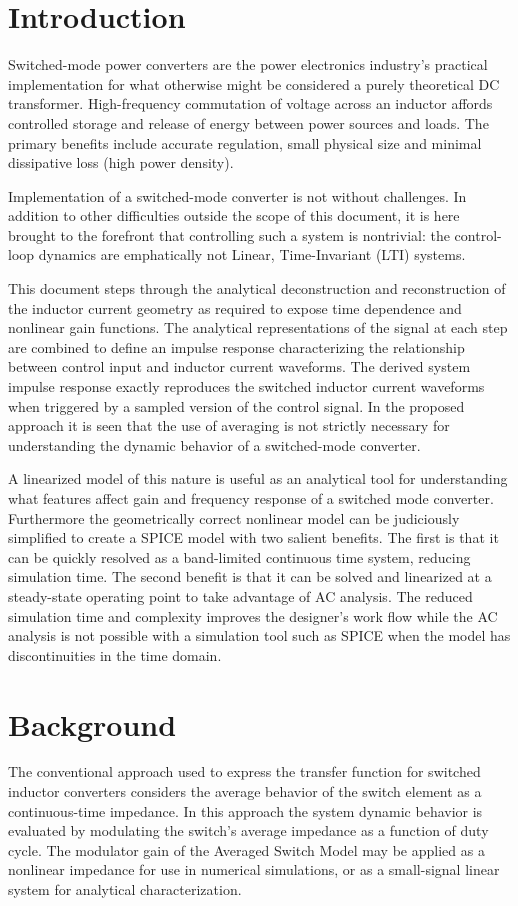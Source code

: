 \documentclass[conference]{IEEEtran}
\begin{document}
\section{Introduction}
Switched-mode power converters are the power electronics industry's practical implementation for what otherwise might be considered a purely theoretical DC transformer. High-frequency commutation of voltage across an inductor affords controlled storage and release of energy between power sources and loads.  The primary benefits include accurate regulation, small physical size and minimal dissipative loss (high power density). 

Implementation of a switched-mode converter is not without challenges. In addition to other difficulties outside the scope of this document, it is here brought to the forefront that controlling such a system is nontrivial: the control-loop dynamics are emphatically not Linear, Time-Invariant (LTI) systems.

This document steps through the analytical deconstruction and reconstruction of the inductor current geometry as required to expose time dependence and nonlinear gain functions. The analytical representations of the signal at each step are combined to define an impulse response characterizing the relationship between control input and inductor current waveforms.  The derived system impulse response exactly reproduces the switched inductor current waveforms when triggered by a sampled version of the control signal. In the proposed approach it is seen that the use of averaging is not strictly necessary for understanding the dynamic behavior of a switched-mode converter.

A linearized model of this nature is useful as an analytical tool for understanding what features affect gain and frequency response of a switched mode converter.  Furthermore the geometrically correct nonlinear model can be judiciously simplified to create a SPICE model with two salient benefits. The first is that it can be quickly resolved as a band-limited continuous time system, reducing simulation time.  The second benefit is that it can be solved and linearized at a steady-state operating point to take advantage of AC analysis. The reduced simulation time and complexity improves the designer's work flow while the AC analysis is not possible with a simulation tool such as SPICE when the model has discontinuities in the time domain.

\section{Background}
The conventional approach used to express the transfer function for switched inductor converters considers the average behavior of the switch element as a continuous-time impedance.  In this approach the system dynamic behavior is evaluated by modulating the switch's average impedance as a function of duty cycle. The modulator gain of the Averaged Switch Model may be applied as a nonlinear impedance for use in numerical simulations, or as a small-signal linear system for analytical characterization.
\end{document}
